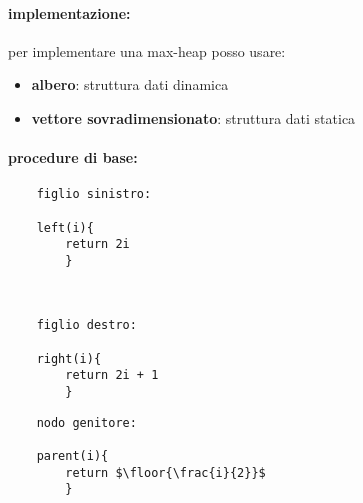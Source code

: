 \documentclass{article}
\DeclarePairedDelimiter\floor{\lfloor}{\rfloor}
\begin{document}
\paragraph{implementazione:} per implementare una max-heap posso usare:
\begin{itemize}
    \item \textbf{albero}: struttura dati dinamica 
    \item \textbf{vettore sovradimensionato}: struttura dati statica
\end{itemize}

\paragraph{procedure di base:}

\begin{tabbing}
\begin{lstlisting}
    figlio sinistro:

    left(i){
        return 2i
        } 
\end{lstlisting}
\
\begin{lstlisting}
    figlio destro:

    right(i){
        return 2i + 1
        }
\end{lstlisting}
\begin{lstlisting}
    nodo genitore:

    parent(i){
        return $\floor{\frac{i}{2}}$
        }
\end{lstlisting}
    
\end{tabbing}
\end{document}
